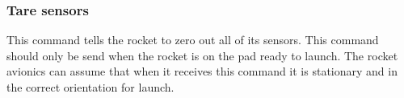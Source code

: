 \subsubsection{Tare sensors}

This command tells the rocket to zero out all of its sensors. This command should only be send when the rocket is on
the pad ready to launch. The rocket avionics can assume that when it receives this command it is stationary and in the
correct orientation for launch.
